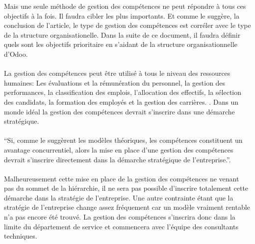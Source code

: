 Mais une seule méthode de gestion des compétences ne peut répondre à tous ces objectifs à la fois. Il faudra cibler les  plus importants. Et comme le suggère, la conclusion de l'article\citep{delobbe}, le type de gestion des compétences est corréler avec le type de la structure organisationelle. Dans la suite de ce document, il faudra définir quels sont les objectifs prioritaire en s'aidant de la structure organisationnelle d'Odoo. 

\paragraph{}La gestion des compétences peut être utilisé à tous le niveau des ressources humaines: Les évaluations et la rémunération du personnel, la gestion des performances, la classification des emplois, l'allocation des effectifs, la sélection des candidats, la formation des employés et la gestion des carrières. \citep[p.32]{delobbe}. Dans un monde idéal la gestion des compétences devrait s'inscrire dans une démarche stratégique. 

\paragraph{}\enquote{Si, comme le suggèrent les modèles théoriques, les compétences constituent un avantage concurrentiel, alors la mise en place d'une gestion des compétences devrait s'inscrire directement dans la démarche stratégique de l'entreprise.}\citep[P. 188]{gestionressourceshumaine2007}.

\paragraph{}Malheureusement cette mise en place de la gestion des compétences ne venant pas du sommet de la hiérarchie, il ne sera pas possible d'inscrire totalement cette démarche dans la stratégie de l'entreprise. Une autre contrainte étant que la stratégie de l'entreprise change assez fréquement car un modèle vraiment rentable n'a pas encore été trouvé. La gestion des compétences s'inscrira donc dans la limite du département de service et commencera avec l'équipe des consultants techniques. 

